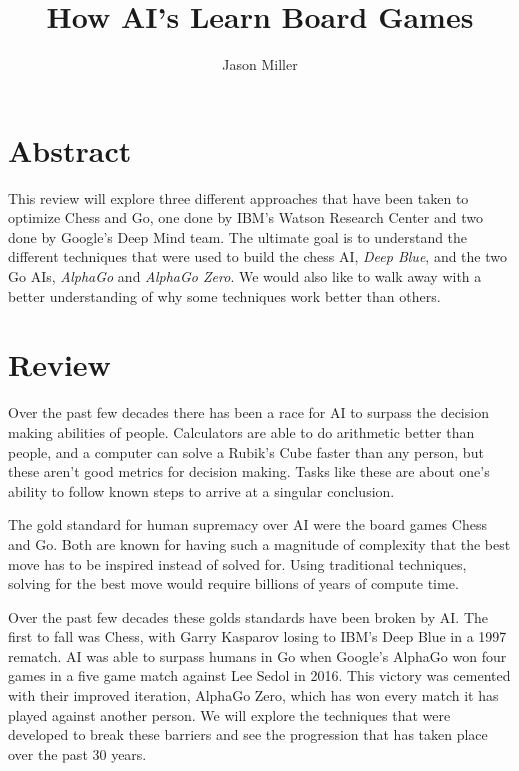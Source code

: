 \documentclass[12pt]{IEEEtran}
\title{How AI's Learn Board Games}
\author{Jason Miller}
\begin{document}
\maketitle

\tableofcontents

\section{Abstract}
This review will explore three different approaches that have been taken to optimize Chess and Go, one done by IBM's Watson Research Center and two done by Google's Deep Mind team. The ultimate goal is to understand the different techniques that were used to build the chess AI, \textit{Deep Blue}, and the two Go AIs, \textit{AlphaGo} and \textit{AlphaGo Zero}. We would also like to walk away with a better understanding of why some techniques work better than others.  

\section{Review}
\par Over the past few decades there has been a race for AI to surpass the decision making abilities of people. Calculators are able to do arithmetic better than people, and a computer can solve a Rubik's Cube faster than any person, but these aren't good metrics for decision making. Tasks like these are about one's ability to follow known steps to arrive at a singular conclusion. 

\par The gold standard for human supremacy over AI were the board games Chess and Go. Both are known for having such a magnitude of complexity that the best move has to be inspired instead of solved for. Using traditional techniques, solving for the best move would require billions of years of compute time. 

\par Over the past few decades these golds standards have been broken by AI. The first to fall was Chess, with Garry Kasparov losing to IBM's Deep Blue in a 1997 rematch. AI was able to surpass humans in Go when Google's AlphaGo won four games in a five game match against Lee Sedol in 2016. This victory was cemented with their improved iteration, AlphaGo Zero, which has won every match it has played against another person. We will explore the techniques that were developed to break these barriers and see the progression that has taken place over the past 30 years. 
\end{document}
